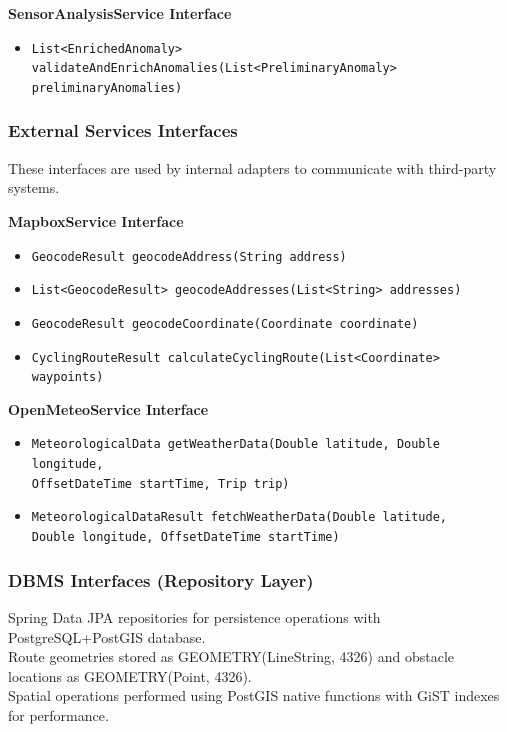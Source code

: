 \textbf{SensorAnalysisService Interface}
\begin{itemize}
    \item \texttt{List<EnrichedAnomaly> validateAndEnrichAnomalies(List<PreliminaryAnomaly> \\ preliminaryAnomalies)}
\end{itemize}

\subsubsection{External Services Interfaces}
These interfaces are used by internal adapters to communicate with third-party systems.

\textbf{MapboxService Interface}
\begin{itemize}
    \item \texttt{GeocodeResult geocodeAddress(String address)}
    \item \texttt{List<GeocodeResult> geocodeAddresses(List<String> addresses)}
    \item \texttt{GeocodeResult geocodeCoordinate(Coordinate coordinate)}
    \item \texttt{CyclingRouteResult calculateCyclingRoute(List<Coordinate> waypoints)}
\end{itemize}

\textbf{OpenMeteoService Interface}
\begin{itemize}
    \item \texttt{MeteorologicalData getWeatherData(Double latitude, Double longitude, \\ OffsetDateTime startTime, Trip trip)}
    \item \texttt{MeteorologicalDataResult fetchWeatherData(Double latitude, \\ Double longitude, OffsetDateTime startTime)}
\end{itemize}

\subsubsection{DBMS Interfaces (Repository Layer)}
Spring Data JPA repositories for persistence operations with PostgreSQL+PostGIS database. \\
Route geometries stored as GEOMETRY(LineString, 4326) and obstacle locations as GEOMETRY(Point, 4326). \\
Spatial operations performed using PostGIS native functions with GiST indexes for performance.

